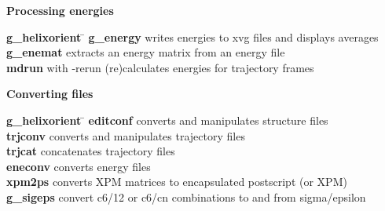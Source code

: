 \begin{description}
\item {\large\bf Processing energies}
\vspace{-2ex}\begin{tabbing}
{\bf g_helixorient} \= \kill
{\bf g_energy} \> writes energies to xvg files and displays averages \\
{\bf g_enemat} \> extracts an energy matrix from an energy file \\
{\bf mdrun} \> with -rerun (re)calculates energies for trajectory frames \\
\end{tabbing}\vspace{-2ex}

\item {\large\bf Converting files}
\vspace{-2ex}\begin{tabbing}
{\bf g_helixorient} \= \kill
{\bf editconf} \> converts and manipulates structure files \\
{\bf trjconv} \> converts and manipulates trajectory files \\
{\bf trjcat} \> concatenates trajectory files \\
{\bf eneconv} \> converts energy files \\
{\bf xpm2ps} \> converts XPM matrices to encapsulated postscript (or XPM) \\
{\bf g_sigeps} \> convert c6/12 or c6/cn combinations to and from sigma/epsilon \\
\end{tabbing}\vspace{-2ex}


\end{description}
